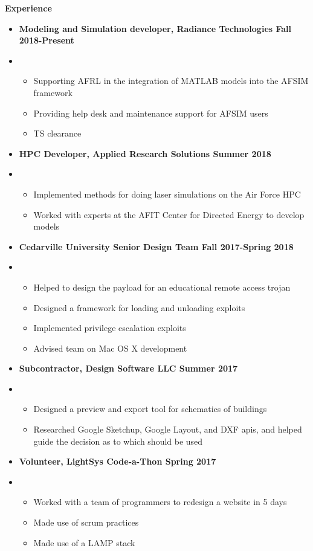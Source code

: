 \documentclass[10pt]{letter}
\begin{document}
   \noindent \textbf{\large{Experience}}
   \begin{itemize}
       \item[] \textbf{Modeling and Simulation developer, Radiance Technologies \hfill Fall 2018-Present}
       \item[] \begin{itemize}
           \item Supporting AFRL in the integration of MATLAB models into the AFSIM framework
           \item Providing help desk and maintenance support for AFSIM users
           \item TS clearance
       \end{itemize}
       \item[] \textbf{HPC Developer, Applied Research Solutions \hfill Summer 2018}
       \item[] \begin{itemize}
           \item Implemented methods for doing laser simulations on the Air Force HPC
           \item Worked with experts at the AFIT Center for Directed Energy to develop models
       \end{itemize}
       \item[] \textbf{Cedarville University Senior Design Team \hfill Fall 2017-Spring 2018}
       \item[] \begin{itemize}
           \item Helped to design the payload for an educational remote access trojan
           \item Designed a framework for loading and unloading exploits
           \item Implemented privilege escalation exploits
           \item Advised team on Mac OS X development
       \end{itemize}
       \item[] \textbf{Subcontractor, Design Software LLC \hfill Summer 2017}
       \item[] \begin{itemize}
           \item Designed a preview and export tool for schematics of buildings
           \item Researched Google Sketchup, Google Layout, and DXF apis, and helped guide the decision as to which should be used
       \end{itemize}
       \item[] \textbf{Volunteer, LightSys Code-a-Thon \hfill Spring 2017}
       \item[] \begin{itemize}
           \item Worked with a team of programmers to redesign a website in 5 days
           \item Made use of scrum practices
           \item Made use of a LAMP stack
       \end{itemize}
   \end{itemize}
   
\end{document}
